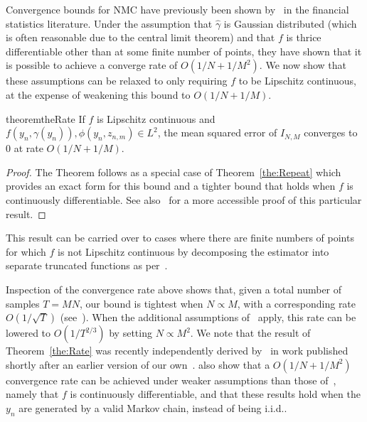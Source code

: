 Convergence bounds for NMC have previously been shown by~\citet{hong2009estimating} in the 
financial statistics literature.  Under the assumption that $\hat{\gamma}$ is Gaussian distributed
(which is often reasonable due to the central limit theorem) and that $f$ is thrice differentiable
other than at some finite number of points, they have shown that it is possible to achieve a
converge rate of $O(1/N+1/M^2)$.  We now show that these assumptions can be relaxed to only requiring
$f$ to be Lipschitz continuous, at the expense of weakening this bound to $O(1/N+1/M)$.
\begin{restatable}{theorem}{theRate} \label{the:Rate}
	If $f$ is Lipschitz continuous and $f(y_n, \gamma(y_n)), \phi(y_n, z_{n,m}) \in
	L^2$, the mean squared error of $I_{N,M}$ converges to $0$ at rate $O\left(1/N +
	1/M\right)$.
\end{restatable}
\begin{proof}
The Theorem follows as a special case of Theorem~\ref{the:Repeat} which
provides an exact form for this bound and a tighter bound
that holds when $f$ is continuously differentiable.  See also~\cite{rainforth2017pitfalls}
for a more accessible proof of this particular result.
\end{proof}
\begin{remark}
This result can be carried over to cases where there are finite numbers of points for which $f$ is
not Lipschitz continuous by decomposing the estimator into separate truncated functions as
per~\cite{hong2009estimating}.
\end{remark}
Inspection of the convergence rate above shows that, given a total number of samples
$T=MN$, our bound is tightest when $N\propto M$, with a
corresponding rate $O(1/\sqrt{T})$ (see~\cite{rainforth2017pitfalls}). 
When the additional assumptions of~\citet{hong2009estimating}
apply, this rate can be lowered to $O(1/T^{2/3})$ by setting $N \propto M^2$.  
We note that
the result of Theorem~\ref{the:Rate} was recently independently derived by~\citet{fort2016mcmc}
in work published shortly after an earlier version of our own~\citep{rainforth2016pitfalls}.
\citet{fort2016mcmc} also show that a $O(1/N+1/M^2)$ convergence rate can be achieved under
weaker assumptions than those of~\citet{hong2009estimating}, namely that $f$ is continuously differentiable,
and that these results hold when the $y_n$ are generated by a valid Markov chain, instead of being i.i.d..

